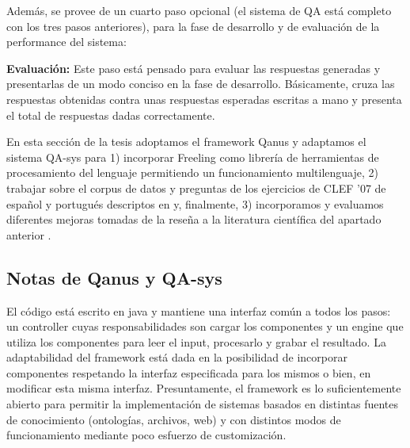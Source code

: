 Además, se provee de un cuarto paso opcional (el sistema de QA está
completo con los tres pasos anteriores), para la fase de desarrollo y
de evaluación de la performance del sistema:\newline


\textbf{Evaluación: }Este paso está pensado para evaluar las respuestas generadas y
presentarlas de un modo conciso en la fase de desarrollo.
Básicamente, cruza las respuestas obtenidas contra unas respuestas
esperadas escritas a mano y presenta el total de respuestas dadas
correctamente.\newline

En esta sección de la tesis adoptamos el framework Qanus y adaptamos el sistema QA-sys para 1) incorporar Freeling como librería de herramientas de procesamiento del lenguaje permitiendo un funcionamiento multilenguaje, 2) trabajar sobre el corpus de datos y preguntas de los ejercicios de CLEF '07 de español y portugués descriptos en  y, finalmente, 3) incorporamos y evaluamos diferentes mejoras tomadas de la reseña a la literatura científica del apartado anterior .

\subsection{Notas de Qanus y QA-sys}

El código está escrito en java y mantiene una interfaz común a
todos los pasos: un controller cuyas responsabilidades son cargar los
componentes y un engine que utiliza los componentes para leer el input,
procesarlo y grabar el resultado. La adaptabilidad del framework está
dada en la posibilidad de incorporar componentes respetando la interfaz
especificada para los mismos o bien, en modificar esta misma interfaz.
Presuntamente, el framework es lo suficientemente abierto para permitir
la implementación de sistemas basados en distintas fuentes de
conocimiento (ontologías, archivos, web) y con distintos modos de
funcionamiento mediante poco esfuerzo de customización.

